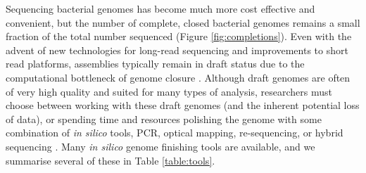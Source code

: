 \documentclass[a4,center,fleqn]{NAR}
\begin{document}
Sequencing bacterial genomes has become much more cost effective and convenient, but the number of complete, closed bacterial genomes remains a small fraction of the total number sequenced (Figure \ref{fig:completions}). Even with the advent of new technologies for long-read sequencing and improvements to short read platforms, assemblies typically remain in draft status due to the computational bottleneck of genome closure \cite{Nagarajan2010,Brouwer2016}. Although draft genomes are often of very high quality and suited for many types of analysis, researchers must choose between working with these draft genomes (and the inherent potential loss of data), or spending time and resources polishing the genome with some combination of \textit{in silico} tools, PCR, optical mapping, re-sequencing, or hybrid sequencing \cite{Nagarajan2010,Utturkar2014}. Many \textit{in silico} genome finishing tools are available, and we summarise several of these in Table \ref{table:tools}.

\enlargethispage{-65.1pt}
\end{document}
